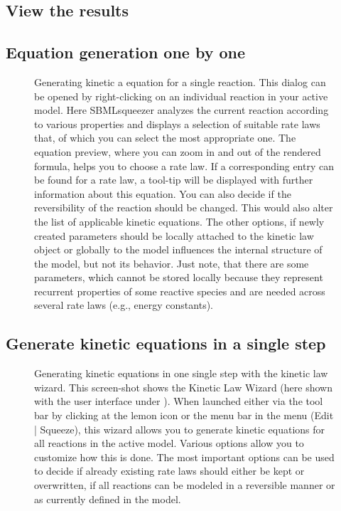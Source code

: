 \subsection{View the results}
\subsection{Equation generation one by one}
\begin{figure}[htbp]
\caption{Generating kinetic a equation for a single reaction. This dialog can
be opened by right-clicking on an individual reaction in your active model.
Here SBMLsqueezer analyzes the current reaction according to various properties
and displays a selection of suitable rate laws that, of which you can select
the most appropriate one. The equation preview, where you can zoom in and out
of the rendered formula, helps you to choose a rate law. If a corresponding
\SBO entry can be found for a rate law, a tool-tip will be displayed with further
information about this equation.
You can also decide if the reversibility of the reaction should be changed.
This would also alter the list of applicable kinetic equations.
The other options, if newly created
parameters should be locally attached to the kinetic law object or globally to
the model influences the internal structure of the model, but not its behavior.
Just note, that there are some parameters, which cannot be stored locally because
they represent recurrent properties of some reactive species and are needed
across several rate laws (e.g., energy constants).}
\label{fig:RateLawDialog}
\end{figure}

\subsection{Generate kinetic equations in a single step}
\begin{figure}[htbp]
\caption{Generating kinetic equations in one single step with the kinetic law wizard.
This screen-shot shows the Kinetic Law Wizard (here shown with the user interface
under \MacOSX). When launched either via the tool bar by clicking at the lemon
icon or the menu bar in the menu (Edit | Squeeze), this wizard allows you to
generate kinetic equations for all reactions in the active model. Various options
allow you to customize how this is done. The most important options can be used
to decide if already existing rate laws should either be kept or overwritten,
if all reactions can be modeled in a reversible manner or as currently
defined in the model.}
\label{fig:KineticLawWizard}
\end{figure}


